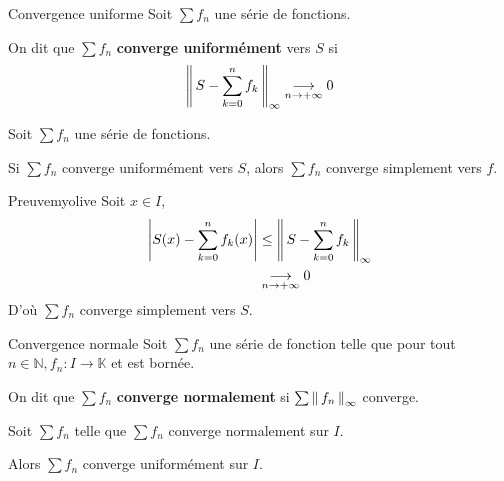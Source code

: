     \begin{defi}{Convergence uniforme}{}
        Soit $\sum f_n$ une série de fonctions. 

        On dit que $\sum f_n$ \textbf{converge uniformément} vers $S$ si 
        \[ \left\lVert\,S - \sum_{k=0}^{n} f_k\,\right\rVert_{\infty} \underset{n \rightarrow +\infty}{\longrightarrow} 0 \] 
    \end{defi}

    \begin{prop}{}{}
        Soit $\sum f_n$ une série de fonctions. 

        Si $\sum f_n$ converge uniformément vers $S$, alors $\sum f_n$ converge simplement vers $f$.
    \end{prop}

    \begin{demo}{Preuve}{myolive}
        Soit $x \in I$, 
        \begin{align*}
            \left\lvert S(x) - \sum_{k=0}^{n}f_k(x)\right\rvert 
            &\leq \left\lVert\,S - \sum_{k=0}^{n} f_k\,\right\rVert_{\infty} \\
            & \underset{n \rightarrow +\infty}{\longrightarrow} 0 
        \end{align*}
        D’où $\sum f_n$ converge simplement vers $S$.
    \end{demo}

    \begin{defi}{Convergence normale}{}
        Soit $\sum f_n$ une série de fonction telle que pour tout $n \in \mathbb{N}, f_n : I \rightarrow \mathbb{K}$ et est bornée.

        On dit que $\sum f_n$ \textbf{converge normalement} si $\sum \left\lVert\,f_n\,\right\rVert_{\infty}$ converge.
    \end{defi}

    \begin{prop}{}{}
        Soit $\sum f_n$ telle que $\sum f_n$ converge normalement sur $I$.

        Alors $\sum f_n$ converge uniformément sur $I$.
    \end{prop}

